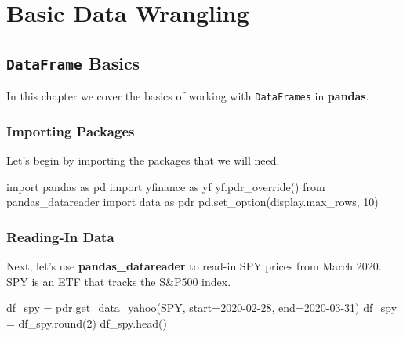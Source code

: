\documentclass[
  letterpaper,
  DIV=11,
  numbers=noendperiod]{scrreprt}
\newenvironment{Shaded}{\begin{snugshade}}{\end{snugshade}}
\newcommand{\BuiltInTok}[1]{\textcolor[rgb]{0.00,0.23,0.31}{#1}}
\newcommand{\DecValTok}[1]{\textcolor[rgb]{0.68,0.00,0.00}{#1}}
\newcommand{\ImportTok}[1]{\textcolor[rgb]{0.00,0.46,0.62}{#1}}
\newcommand{\NormalTok}[1]{\textcolor[rgb]{0.00,0.23,0.31}{#1}}
\newcommand{\OperatorTok}[1]{\textcolor[rgb]{0.37,0.37,0.37}{#1}}
\newcommand{\StringTok}[1]{\textcolor[rgb]{0.13,0.47,0.30}{#1}}
\begin{document}
\part{Basic Data Wrangling}

\hypertarget{dataframe-basics}{%
\chapter{\texorpdfstring{\texttt{DataFrame}
Basics}{DataFrame Basics}}\label{dataframe-basics}}

In this chapter we cover the basics of working with \texttt{DataFrames}
in \textbf{pandas}.

\hypertarget{importing-packages-1}{%
\section{Importing Packages}\label{importing-packages-1}}

Let's begin by importing the packages that we will need.

\begin{Shaded}
\begin{Highlighting}[]
\ImportTok{import}\NormalTok{ pandas }\ImportTok{as}\NormalTok{ pd}
\ImportTok{import}\NormalTok{ yfinance }\ImportTok{as}\NormalTok{ yf}
\NormalTok{yf.pdr\_override()}
\ImportTok{from}\NormalTok{ pandas\_datareader }\ImportTok{import}\NormalTok{ data }\ImportTok{as}\NormalTok{ pdr}
\NormalTok{pd.set\_option(}\StringTok{\textquotesingle{}display.max\_rows\textquotesingle{}}\NormalTok{, }\DecValTok{10}\NormalTok{)}
\end{Highlighting}
\end{Shaded}

\hypertarget{reading-in-data}{%
\section{Reading-In Data}\label{reading-in-data}}

Next, let's use \textbf{pandas\_datareader} to read-in SPY prices from
March 2020. SPY is an ETF that tracks the S\&P500 index.

\begin{Shaded}
\begin{Highlighting}[]
\NormalTok{df\_spy }\OperatorTok{=}\NormalTok{ pdr.get\_data\_yahoo(}\StringTok{\textquotesingle{}SPY\textquotesingle{}}\NormalTok{, start}\OperatorTok{=}\StringTok{\textquotesingle{}2020{-}02{-}28\textquotesingle{}}\NormalTok{, end}\OperatorTok{=}\StringTok{\textquotesingle{}2020{-}03{-}31\textquotesingle{}}\NormalTok{)}
\NormalTok{df\_spy }\OperatorTok{=}\NormalTok{ df\_spy.}\BuiltInTok{round}\NormalTok{(}\DecValTok{2}\NormalTok{)}
\NormalTok{df\_spy.head()}
\end{Highlighting}
\end{Shaded}
\end{document}
